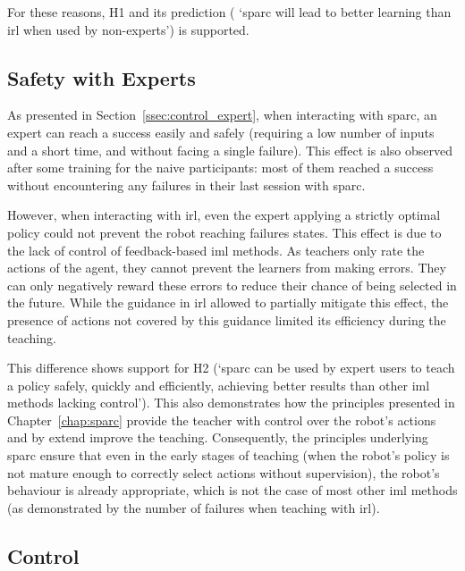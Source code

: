 For these reasons, H1 and its prediction ( `\gls{sparc} will lead to better learning than \gls{irl} when used by non-experts') is supported.

\subsection{Safety with Experts}

As presented in Section~\ref{ssec:control_expert}, when interacting with \gls{sparc}, an expert can reach a success easily and safely (requiring a low number of inputs and a short time, and without facing a single failure). This effect is also observed after some training for the naive participants: most of them reached a success without encountering any failures in their last session with \gls{sparc}.

However, when interacting with \gls{irl}, even the expert applying a strictly optimal policy could not prevent the robot reaching failures states. This effect is due to the lack of control of feedback-based \gls{iml} methods. As teachers only rate the actions of the agent, they cannot prevent the learners from making errors. They can only negatively reward these errors to reduce their chance of being selected in the future. While the guidance in \gls{irl} allowed to partially mitigate this effect, the presence of actions not covered by this guidance limited its efficiency during the teaching.

This difference shows support for H2 (`\gls{sparc} can be used by expert users to teach a policy safely, quickly and efficiently, achieving better results than other \gls{iml} methods lacking control'). This also demonstrates how the principles presented in Chapter~\ref{chap:sparc} provide the teacher with control over the robot's actions and by extend improve the teaching. Consequently, the principles underlying \gls{sparc} ensure that even in the early stages of teaching (when the robot's policy is not mature enough to correctly select actions without supervision), the robot's behaviour is already appropriate, which is not the case of most other \gls{iml} methods (as demonstrated by the number of failures when teaching with \gls{irl}).

\subsection{Control}
\label{ssec:control_control}

